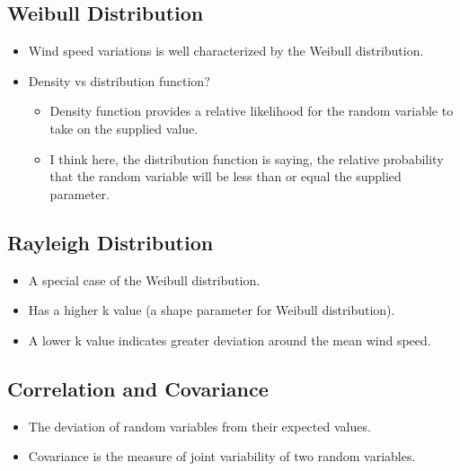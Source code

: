 \documentclass[11pt]{article}
\begin{document}
\hypertarget{weibull-distribution}{%
\subsection{Weibull Distribution}\label{weibull-distribution}}

\begin{itemize}
\tightlist
\item
  Wind speed variations is well characterized by the Weibull
  distribution.
\item
  Density vs distribution function?

  \begin{itemize}
  \tightlist
  \item
    Density function provides a relative likelihood for the random
    variable to take on the supplied value.
  \item
    I think here, the distribution function is saying, the relative
    probability that the random variable will be less than or equal the
    supplied parameter.
  \end{itemize}
\end{itemize}

\hypertarget{rayleigh-distribution}{%
\subsection{Rayleigh Distribution}\label{rayleigh-distribution}}

\begin{itemize}
\tightlist
\item
  A special case of the Weibull distribution.
\item
  Has a higher k value (a shape parameter for Weibull distribution).
\item
  A lower k value indicates greater deviation around the mean wind
  speed.
\end{itemize}

\hypertarget{correlation-and-covariance}{%
\subsection{Correlation and
Covariance}\label{correlation-and-covariance}}

\begin{itemize}
\tightlist
\item
  The deviation of random variables from their expected values.
\item
  Covariance is the measure of joint variability of two random
  variables.
\end{itemize}
\end{document}
